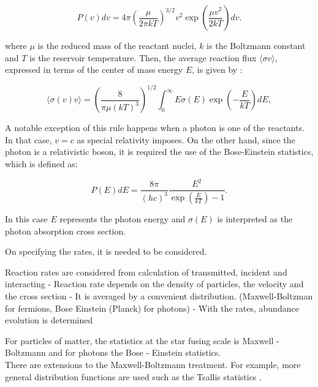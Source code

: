\documentclass[openany]{book}
\begin{document}
\begin{equation} \label{eq:reactionRate_maxwellBoltzmann}
	P(v)dv = 4\pi \left( \frac{\mu}{2\pi kT}\right)^{3/2} v^2 \exp{\left({\frac{\mu v^2}{2kT}}\right)}dv.
\end{equation}


where $\mu$ is the reduced mass of the reactant nuclei,  $k$ is the Boltzmann constant and $T$ is the reservoir temperature. Then, the average reaction flux $\langle \sigma v \rangle $, expressed in terms of the center of mass energy $E$, is given by \cite{ueda_sargeant_pato_hussein_2004}:

\begin{equation}  \label{eq:reactionRate_definition}
	\langle \sigma(v) v \rangle = \left(\frac{8}{\pi \mu (kT)^3 }\right)^{1/2}  \int_0^{\infty} { E \sigma(E) \exp\left({-\frac{E}{kT}}\right)  dE},
\end{equation}


A notable exception of this rule happens when a photon is one of the reactants. In that case, $v = c$ as special relativity imposes. On the other hand, since the photon is a relativistic boson, it is required the use of the Bose-Einstein statistics, which is defined as:  

\begin{equation} \label{eq:reactionRate_boseEinstein}
	P(E)dE = \frac{8\pi}{(hc)^3} \frac{E^2}{\exp{\left(\frac{E}{kT}\right)} - 1}.
\end{equation}

In this case $E$ represents the photon energy and $\sigma(E)$ is interpreted as the photon absorption cross section.


On specifying the rates, it is needed to be considered.

Reaction rates are considered from calculation of transmitted, incident and interacting 
- Reaction rate depends on the density of particles, the velocity and the cross section
-	It is averaged by a convenient distribution. (Maxwell-Boltzman for fermions, Bose Einstein (Planck) for photons)
-	With the rates, abundance evolution is determined 

 For particles of matter, the statistics at the star fusing scale is Maxwell - Boltzmann and for photons the Bose - Einstein statistics. \\ 


There are extensions to the Maxwell-Boltzmann treatment. For example, more general distribution functions are used such as the Tsallis statistics \cite{haubold_kumar_2008}.  \\
\end{document}

